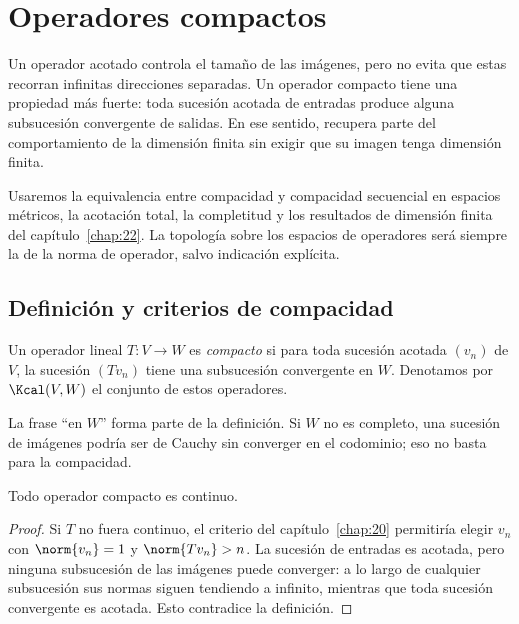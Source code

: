 \chapter{Operadores compactos}\label{chap:23}

Un operador acotado controla el tamaño de las imágenes, pero no evita que estas recorran infinitas direcciones separadas. Un operador compacto tiene una propiedad más fuerte: toda sucesión acotada de entradas produce alguna subsucesión convergente de salidas. En ese sentido, recupera parte del comportamiento de la dimensión finita sin exigir que su imagen tenga dimensión finita.

Usaremos la equivalencia entre compacidad y compacidad secuencial en espacios métricos, la acotación total, la completitud y los resultados de dimensión finita del capítulo~\ref{chap:22}. La topología sobre los espacios de operadores será siempre la de la norma de operador, salvo indicación explícita.

\section{Definición y criterios de compacidad}

\begin{definicion}
Un operador lineal $T:V\to W$ es \emph{compacto} si para toda sucesión acotada $(v_n)$ de $V$, la sucesión $(Tv_n)$ tiene una subsucesión convergente en $W$. Denotamos por $\Kcal(V,W)$ el conjunto de estos operadores.
\end{definicion}

La frase ``en $W$'' forma parte de la definición. Si $W$ no es completo, una sucesión de imágenes podría ser de Cauchy sin converger en el codominio; eso no basta para la compacidad.

\begin{proposicion}\label{ch23:compacto-acotado}
Todo operador compacto es continuo.
\end{proposicion}
\begin{proof}
Si $T$ no fuera continuo, el criterio del capítulo~\ref{chap:20} permitiría elegir $v_n$ con $\norm{v_n}=1$ y $\norm{Tv_n}>n$. La sucesión de entradas es acotada, pero ninguna subsucesión de las imágenes puede converger: a lo largo de cualquier subsucesión sus normas siguen tendiendo a infinito, mientras que toda sucesión convergente es acotada. Esto contradice la definición.
\end{proof}

